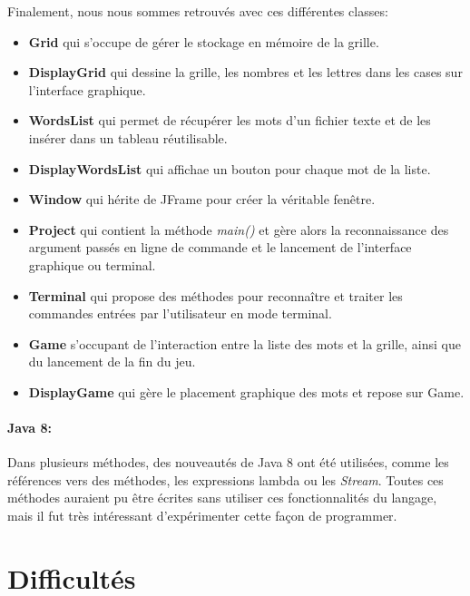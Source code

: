 \documentclass{article}
\begin{document}
Finalement, nous nous sommes retrouvés avec ces différentes classes:
\begin{itemize}
  \item \textbf{Grid} qui s'occupe de gérer le stockage en mémoire de la grille.
  \item \textbf{DisplayGrid} qui dessine la grille, les nombres et les lettres dans les cases sur l'interface graphique.
  \item \textbf{WordsList} qui permet de récupérer les mots d'un fichier texte et de les insérer dans un tableau réutilisable.
  \item \textbf{DisplayWordsList} qui affichae un bouton pour chaque mot de la liste.
  \item \textbf{Window} qui hérite de JFrame pour créer la véritable fenêtre.
  \item \textbf{Project} qui contient la méthode \textit{main()} et gère alors la reconnaissance des argument passés en ligne de commande et le lancement de l'interface graphique ou terminal.
  \item \textbf{Terminal} qui propose des méthodes pour reconnaître et traiter les commandes entrées par l'utilisateur en mode terminal.
  \item \textbf{Game} s'occupant de l'interaction entre la liste des mots et la grille, ainsi que du lancement de la fin du jeu.
  \item \textbf{DisplayGame} qui gère le placement graphique des mots et repose sur Game.
\end{itemize}

\paragraph{Java 8:} Dans plusieurs méthodes, des nouveautés de Java 8 ont été utilisées, comme les références vers des méthodes, les expressions lambda ou les \textit{Stream}. Toutes ces méthodes auraient pu être écrites sans utiliser ces fonctionnalités du langage, mais il fut très intéressant d'expérimenter cette façon de programmer.


\section{Difficultés}
\end{document}
